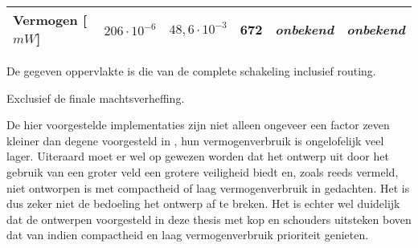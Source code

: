 \begin{table}[h]
\begin{narrow}{-2cm}{-2cm}
\begin{tabular}{llllll}
			Vermogen [$mW$]																& $206 \cdot 10^{-6}$		& $48,6 \cdot 10^{-3}$		& 672							& \emph{onbekend}				& \emph{onbekend}\\
			\bottomrule		
		\end{tabular}
	\end{narrow}
	
	\footnotesize \footnotemark[2] De gegeven oppervlakte is die van de complete schakeling inclusief routing.
	
	\footnotemark[3] Exclusief de finale machtsverheffing.
	
\end{table}

De hier voorgestelde implementaties zijn niet alleen ongeveer een factor zeven kleiner dan degene voorgesteld in \cite{beuchat-asic}, hun vermogenverbruik is ongelofelijk veel lager. Uiteraard moet er wel op gewezen worden dat het ontwerp uit \cite{beuchat-asic} door het gebruik van een groter veld een grotere veiligheid biedt en, zoals reeds vermeld, niet ontworpen is met compactheid of laag vermogenverbruik in gedachten. Het is dus zeker niet de bedoeling het ontwerp af te breken. Het is echter wel duidelijk dat de ontwerpen voorgesteld in deze thesis met kop en schouders uitsteken boven dat van \cite{beuchat-asic} indien compactheid en laag vermogenverbruik prioriteit genieten.
